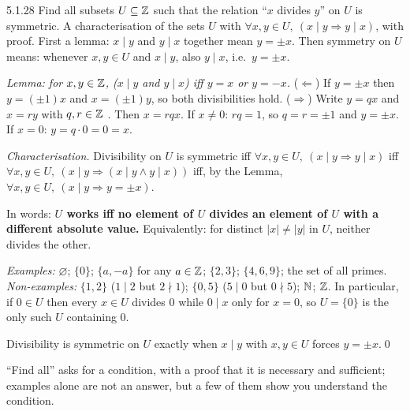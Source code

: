 \begin{bookex}[essential]{5.1.28}
Find all subsets $U\subseteq\mathbb{Z}$ such that the relation ``$x$ divides $y$'' on $U$ is symmetric.
\solution
\goal A characterisation of the sets $U$ with $\forall x,y\in U,\ (x\mid y\Rightarrow y\mid x)$, with proof.
\plan First a lemma: $x\mid y$ and $y\mid x$ together mean $y=\pm x$. Then symmetry on $U$ means: whenever $x,y\in U$ and $x\mid y$, also $y\mid x$, i.e.\ $y=\pm x$.
\begin{steps}
\item \emph{Lemma: for $x,y\in\mathbb{Z}$, ($x\mid y$ and $y\mid x$) iff $y=x$ or $y=-x$.} ($\Leftarrow$) If $y=\pm x$ then $y=(\pm1)x$ and $x=(\pm1)y$, so both divisibilities hold. ($\Rightarrow$) Write $y=qx$ and $x=ry$ with $q,r\in\mathbb{Z}$ . Then $x=rqx$. If $x\ne0$: $rq=1$, so $q=r=\pm1$  and $y=\pm x$. If $x=0$: $y=q\cdot0=0=x$.
\item \emph{Characterisation.} Divisibility on $U$ is symmetric iff $\forall x,y\in U,\ (x\mid y\Rightarrow y\mid x)$  iff $\forall x,y\in U,\ (x\mid y\Rightarrow(x\mid y\wedge y\mid x))$ iff, by the Lemma, $\forall x,y\in U,\ (x\mid y\Rightarrow y=\pm x)$.
\item In words: \textbf{$U$ works iff no element of $U$ divides an element of $U$ with a different absolute value.} Equivalently: for distinct $|x|\ne|y|$ in $U$, neither divides the other.
\item \emph{Examples:} $\varnothing$; $\{0\}$; $\{a,-a\}$ for any $a\in\mathbb{Z}$; $\{2,3\}$; $\{4,6,9\}$; the set of all primes. \emph{Non-examples:} $\{1,2\}$ ($1\mid2$ but $2\nmid1$); $\{0,5\}$ ($5\mid0$ but $0\nmid5$); $\mathbb{N}$; $\mathbb{Z}$. In particular, if $0\in U$ then every $x\in U$ divides $0$ while $0\mid x$ only for $x=0$, so $U=\{0\}$ is the only such $U$ containing $0$.
\end{steps}
\conclusion Divisibility is symmetric on $U$ exactly when $x\mid y$ with $x,y\in U$ forces $y=\pm x$.\qed
\begin{compare}
\item ``Find all'' asks for a condition, with a proof that it is necessary and sufficient; examples alone are not an answer, but a few of them show you understand the condition.
\end{compare}
\end{bookex}

